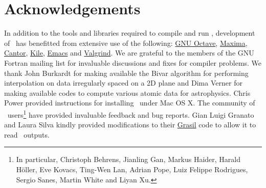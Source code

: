 \chapter{Acknowledgements}

In addition to the tools and libraries required to compile and run \glc, development of \glc\ has benefitted from extensive use of the following: \href{http://www.gnu.org/software/octave/}{{\sc GNU Octave}}, \href{http://maxima.sourceforge.net/}{{\sc Maxima}}, \href{http://edu.kde.org/cantor/}{{\sc Cantor}}, \href{http://kile.sourceforge.net/}{{\sc Kile}}, \href{http://www.gnu.org/software/emacs/}{{\sc Emacs}} and \href{http://valgrind.org/}{{\sc Valgrind}}. We are grateful to the members of the {\sc GNU Fortran} mailing list for invaluable discussions and fixes for compiler problems. We thank John Burkardt for making available the {\sc Bivar} algorithm for performing interpolation on data irregularly spaced on a 2D plane and Dima Verner for making available codes to compute various atomic data for astrophysics. Chris Power provided instructions for installing \glc\ under Mac OS X. The community of \glc\ users\footnote{In particular, Christoph Behrens, Jianling Gan, Markus Haider, Harald H\"oller, Eve Kovacs, Ting-Wen Lan, Adrian Pope, Luiz Felippe Rodrigues, Sergio Sanes, Martin White and Liyan Xu.} have provided invaluable feedback and bug reports. Gian Luigi Granato and Laura Silva kindly provided modifications to their \href{http://adlibitum.oat.ts.astro.it/silva/grasil/grasil.html}{\sc Grasil} code to allow it to read \glc\ outputs.
